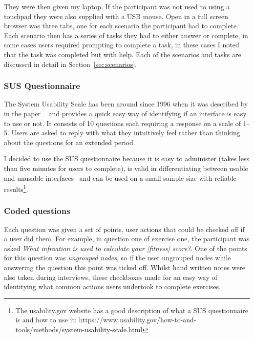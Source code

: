 They were then given my laptop. If the participant was not used to using a touchpad they were also supplied with a USB mouse. Open in a full screen browser was three tabs, one for each scenario the participant had to complete. Each scenario then has a series of tasks they had to either answer or complete, in some cases users required prompting to complete a task, in these cases I noted that the task was completed but with help. Each of the scenarios and tasks are discussed in detail in Section~\ref{sec:scenarios}.

\subsubsection{SUS Questionnaire}
\label{sec:sus_questionnaire}

The System Usability Scale has been around since 1996 when it was described by \citeauthor{brooke1996} in the paper ~\cite{brooke1996} and provides a quick easy way of identifying if an interface is easy to use or not. It consists of 10 questions each requiring a response on a scale of 1--5. Users are asked to reply with what they intuitively feel rather than thinking about the questions for an extended period. 

I decided to use the SUS questionnaire because it is easy to administer (takes less than five minutes for users to complete), is valid in differentiating between usable and unusable interfaces~\cite{sauro2011} and can be used on a small sample size with reliable results\footnote{The usability.gov website has a good description of what a SUS questionnaire is and how to use it: https://www.usability.gov/how-to-and-tools/methods/system-usability-scale.html}.

\subsubsection{Coded questions}
\label{sec:coded_questions}

Each question was given a set of points, user actions that could be checked off if a user did them. For example, in question one of exercise one, the participant was asked \textit{What infroation is used to calculate your [fitness] score?}. One of the points for this question was \textit{ungrouped nodes}, so if the user ungrouped nodes while answering the question this point was ticked off. Whilst hand written notes were also taken during interviews, these checkboxes made for an easy way of identitying what common actions users undertook to complete exercises. 

